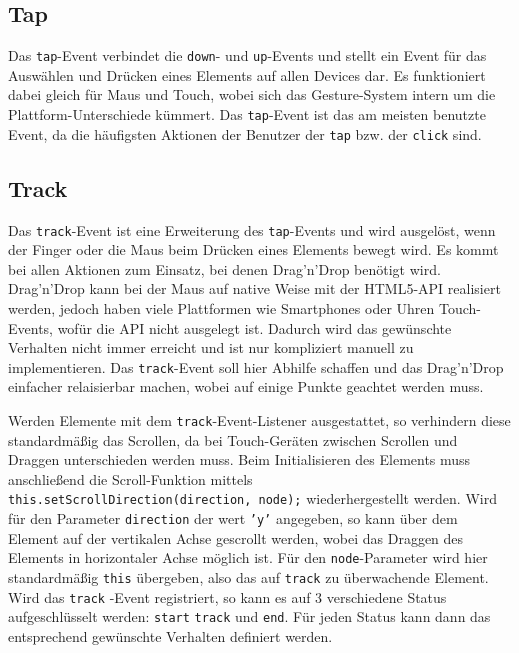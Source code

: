 


\subsection{Tap}\label{tap}

Das \texttt{tap}-Event verbindet die \texttt{down}- und \texttt{up}-Events und stellt ein Event für das Auswählen und Drücken eines Elements auf allen Devices dar. Es funktioniert dabei gleich für Maus und Touch, wobei sich das Gesture-System intern um die Plattform-Unterschiede kümmert. Das \texttt{tap}-Event ist das am meisten benutzte Event, da die häufigsten Aktionen der Benutzer der \texttt{tap} bzw. der \texttt{click} sind.


\subsection{Track}\label{track}

Das \texttt{track}-Event ist eine Erweiterung des \texttt{tap}-Events und wird ausgelöst, wenn der Finger oder die Maus beim Drücken eines Elements bewegt wird. Es kommt bei allen Aktionen zum Einsatz, bei denen Drag'n'Drop benötigt wird. Drag'n'Drop kann bei der Maus auf native Weise mit der \ac{HTML}5-\ac{API} realisiert werden, jedoch haben viele Plattformen wie Smartphones oder Uhren Touch-Events, wofür die \ac{API} nicht ausgelegt ist. Dadurch wird das gewünschte Verhalten nicht immer erreicht und ist nur kompliziert manuell zu implementieren. Das \texttt{track}-Event soll hier Abhilfe schaffen und das Drag'n'Drop einfacher relaisierbar machen, wobei auf einige Punkte geachtet werden muss.

Werden Elemente mit dem \texttt{track}-Event-Listener ausgestattet, so verhindern diese standardmäßig das Scrollen, da bei Touch-Geräten zwischen Scrollen und Draggen unterschieden werden muss. Beim Initialisieren des Elements muss anschließend die Scroll-Funktion mittels \texttt{this.setScrollDirection(direction,\ node);} wiederhergestellt werden. Wird für den Parameter \texttt{direction} der wert \texttt{'y'} angegeben, so kann über dem Element auf der vertikalen Achse gescrollt werden, wobei das Draggen des Elements in horizontaler Achse möglich ist. Für den \texttt{node}-Parameter wird hier standardmäßig \texttt{this} übergeben, also das auf \texttt{track} zu überwachende Element. Wird das \texttt{track} -Event registriert, so kann es auf 3 verschiedene Status aufgeschlüsselt werden: \texttt{start} \texttt{track} und \texttt{end}. Für jeden Status kann dann das entsprechend gewünschte Verhalten definiert werden.


